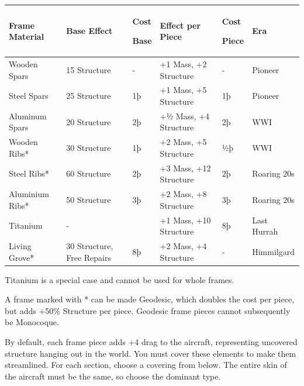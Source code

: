 \documentclass{article}
\begin{document}
\begin{tabular}{|l|l|l|l|l|l|}
    \hline
    Frame Material  & Base Effect                & Cost

    Base            & Effect per Piece           & Cost

    Piece           & Era                                                                                 \\\hline
    Wooden Spars    & 15 Structure               & -          & +1 Mass, +2 Structure  & -  & Pioneer     \\\hline
    Steel Spars     & 25 Structure               & 1þ         & +1 Mass, +5 Structure  & 1þ &
    Pioneer                                                                                               \\\hline
    Aluminum Spars  & 20 Structure               & 2þ         & +½ Mass, +4 Structure  & 2þ & WWI         \\\hline
    Wooden Ribs*    & 30 Structure               & 1þ         & +2 Mass, +5 Structure  & ½þ & WWI         \\\hline
    Steel Ribs*     & 60 Structure               & 2þ         & +3 Mass, +12 Structure & 2þ & Roaring
    20s                                                                                                   \\\hline
    Aluminium Ribs* & 50 Structure               & 3þ         & +2 Mass, +8 Structure  & 3þ &
    Roaring 20s                                                                                           \\\hline
    Titanium        & -                          &            & +1 Mass, +10 Structure & 8þ & Last Hurrah \\\hline
    Living Grove*   & 30 Structure, Free Repairs & 8þ         & +2 Mass, +4 Structure
                    & -                          & Himmilgard                                             \\\hline
\end{tabular}

Titanium is a special case and cannot be used for whole frames.

A frame marked with * can be made Geodesic, which doubles the
cost per piece, but adds +50\% Structure per piece. Geodesic frame
pieces cannot subsequently be Monocoque.

By default, each frame piece adds +4 drag to the aircraft,
representing uncovered structure hanging out in the world. You must
cover these elements to make them streamlined. For each section, choose
a covering from below. The entire skin of the aircraft must be the same,
so choose the dominant type.
\end{document}
